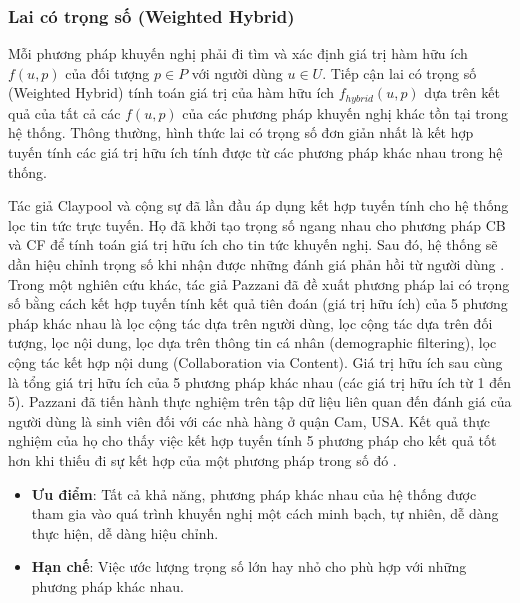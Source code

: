 \subsubsection{Lai có trọng số (Weighted Hybrid)}
Mỗi phương pháp khuyến nghị phải đi tìm và xác định giá trị hàm hữu ích $f(u,p)$ của đối tượng $p \in P$ với người dùng $u \in U$. Tiếp cận lai có trọng số (Weighted Hybrid) tính toán giá trị của hàm hữu ích $f_{hybrid}(u,p)$ dựa trên kết quả của tất cả các $f(u,p)$ của các phương pháp khuyến nghị khác tồn tại trong hệ thống. Thông thường, hình thức lai có trọng số đơn giản nhất là kết hợp tuyến tính các giá trị hữu ích tính được từ các phương pháp khác nhau trong hệ thống. 

Tác giả Claypool và cộng sự đã lần đầu áp dụng kết hợp tuyến tính cho hệ thống lọc tin tức trực tuyến. Họ đã khởi tạo trọng số ngang nhau cho phương pháp CB và CF để tính toán giá trị hữu ích cho tin tức khuyến nghị. Sau đó, hệ thống sẽ dần hiệu chỉnh trọng số khi nhận được những đánh giá phản hồi từ người dùng \cite{Claypool:99:HybridRecSys}. Trong một nghiên cứu khác, tác giả Pazzani đã đề xuất phương pháp lai có trọng số bằng cách kết hợp tuyến tính kết quả tiên đoán (giá trị hữu ích) của 5 phương pháp khác nhau là lọc cộng tác dựa trên người dùng, lọc cộng tác dựa trên đối tượng, lọc nội dung, lọc dựa trên thông tin cá nhân (demographic filtering), lọc cộng tác kết hợp nội dung (Collaboration via Content). Giá trị hữu ích sau cùng là tổng giá trị hữu ích của 5 phương pháp khác nhau (các giá trị hữu ích từ 1 đến 5). Pazzani đã tiến hành thực nghiệm trên tập dữ liệu liên quan đến đánh giá của người dùng là sinh viên đối với các nhà hàng ở quận Cam, USA. Kết quả thực nghiệm của họ cho thấy việc kết hợp tuyến tính 5 phương pháp cho kết quả tốt hơn khi thiếu đi sự kết hợp của một phương pháp trong số đó \cite{Pazzani:1999:FCC}.

\begin{itemize}
	\item \textbf{Ưu điểm}: Tất cả khả năng, phương pháp khác nhau của hệ thống được tham gia vào quá trình khuyến nghị một cách minh bạch, tự nhiên, dễ dàng thực hiện, dễ dàng hiệu chỉnh.
\end{itemize}

\begin{itemize}
	\item \textbf{Hạn chế}: Việc ước lượng trọng số lớn hay nhỏ cho phù hợp với những phương pháp khác nhau.
\end{itemize}

